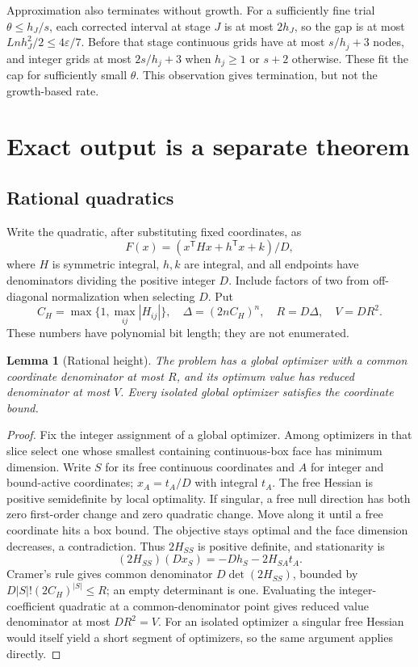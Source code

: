 \documentclass[11pt]{article}
\newtheorem{lemma}[theorem]{Lemma}
\theoremstyle{remark}
\begin{document}
Approximation also terminates without growth. For a sufficiently fine
trial $\theta\le h_J/s$, each corrected interval at stage $J$ is at
most $2h_J$, so the gap is at most $Lnh_J^2/2\le4\varepsilon/7$.
Before that stage continuous grids have at most $s/h_j+3$ nodes, and
integer grids at most $2s/h_j+3$ when $h_j\ge1$ or $s+2$ otherwise.
These fit the cap for sufficiently small $\theta$. This observation
gives termination, but not the growth-based rate.

\section{Exact output is a separate theorem}\label{sec:exact}

\subsection{Rational quadratics}

Write the quadratic, after substituting fixed coordinates, as
\[
F(x)=(x^{\mathsf T}Hx+h^{\mathsf T}x+k)/D,
\]
where $H$ is symmetric integral, $h,k$ are integral, and all endpoints
have denominators dividing the positive integer $D$. Include factors of
two from off-diagonal normalization when selecting $D$. Put
\begin{equation}\label{eq:height}
C_H=\max\{1,\max_{ij}|H_{ij}|\},\quad
\Delta=(2nC_H)^n,\quad R=D\Delta,\quad V=DR^2.
\end{equation}
These numbers have polynomial bit length; they are not enumerated.

\begin{lemma}[Rational height]\label{lem:height}
The problem has a global optimizer with a common coordinate denominator
at most $R$, and its optimum value has reduced denominator at most $V$.
Every isolated global optimizer satisfies the coordinate bound.
\end{lemma}
\begin{proof}
Fix the integer assignment of a global optimizer. Among optimizers in
that slice select one whose smallest containing continuous-box face has
minimum dimension. Write $S$ for its free continuous coordinates and
$A$ for integer and bound-active coordinates; $x_A=t_A/D$ with integral
$t_A$. The free Hessian is positive semidefinite by local optimality.
If singular, a free null direction has both zero first-order change and
zero quadratic change. Move along it until a free coordinate hits a box
bound. The objective stays optimal and the face dimension decreases,
a contradiction. Thus $2H_{SS}$ is positive definite, and stationarity is
\[
(2H_{SS})(Dx_S)=-Dh_S-2H_{SA}t_A.
\]
Cramer's rule gives common denominator $D\det(2H_{SS})$, bounded by
$D|S|!(2C_H)^{|S|}\le R$; an empty determinant is one.
Evaluating the integer-coefficient quadratic at a common-denominator
point gives reduced value denominator at most $DR^2=V$.
For an isolated optimizer a singular free Hessian would itself yield
a short segment of optimizers, so the same argument applies directly.
\end{proof}
\end{document}

